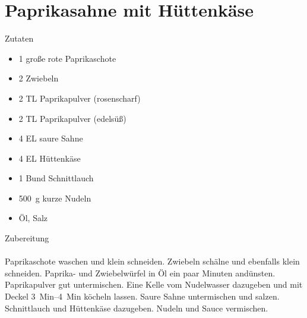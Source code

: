\section*{Paprikasahne mit Hüttenkäse}
\ihead{}\ohead{}
\cfoot{}
{\Large Zutaten}
\begin{multicols}{2}
\begin{itemize}
    \item \num{1} große rote Paprikaschote
    \item \num{2} Zwiebeln
    \item \num{2} TL Paprikapulver (rosenscharf)
    \item \num{2} TL Paprikapulver (edelsüß)
    \item \num{4} EL saure Sahne 
    \item \num{4} EL Hüttenkäse
    \item \num{1} Bund Schnittlauch 
    \item \SI{500}{g} kurze Nudeln
    \item Öl, Salz
\end{itemize}
\end{multicols}
\noindent
{\Large Zubereitung}\\
\\
Paprikaschote waschen und klein schneiden. 
Zwiebeln schälne und ebenfalls klein schneiden.
Paprika- und Zwiebelwürfel in Öl ein paar Minuten andünsten.
Paprikapulver gut untermischen. 
Eine Kelle vom Nudelwasser dazugeben und mit Deckel \SIrange{3}{4}{Min} köcheln lassen.
Saure Sahne untermischen und salzen.
Schnittlauch und Hüttenkäse dazugeben. 
Nudeln und Sauce vermischen. 